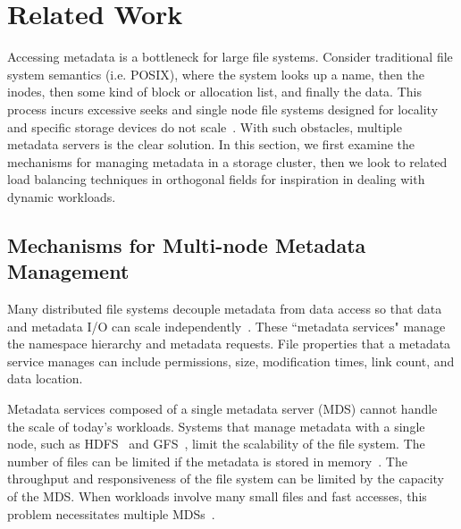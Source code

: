 
\chapter{Related Work}
\label{related-work}
Accessing metadata is a bottleneck for large file systems.  Consider traditional file system semantics (i.e. POSIX), where the system looks up a name, then the inodes, then some kind of block or allocation list, and finally the data. This process incurs excessive seeks and single node file systems designed for locality and specific storage devices do not scale~\cite{mckusick:acm1984-FFS, rosenblum:acm1992-LFS}. With such obstacles, multiple metadata servers is the clear solution. In this section, we first examine the mechanisms for managing metadata in a storage cluster, then we look to related load balancing techniques in orthogonal fields for inspiration in dealing with dynamic workloads.

\section{Mechanisms for Multi-node Metadata Management}
\label{related-work:mechanisms}
Many distributed file systems decouple metadata from data access so that data and metadata I/O can scale independently~\cite{alam:pdsw2011-metadata-scaling, ghemawat:sosp2003-gfs, hildebrand:msst2005-pnfs,website:lustre,weil:osdi2006-ceph,welch:fast2008-panasas,xing:sc2009-skyfs}. These ``metadata services" manage the namespace hierarchy and metadata requests. File properties that a metadata service manages can include permissions, size, modification times, link count, and data location. 

Metadata services composed of a single metadata server (MDS) cannot handle the scale of today's workloads. Systems that manage metadata with a single node, such as HDFS~\cite{shvachko:login2012-hdfs-scalability} and GFS~\cite{ghemawat:sosp2003-gfs},  limit the scalability of the file system. The number of files can be limited if the metadata is stored in memory~\cite{ghemawat:sosp2003-gfs, weil:osdi2006-ceph,shvachko:login2012-hdfs-scalability}. The throughput and responsiveness of the file system can be limited by the capacity of the MDS. When workloads involve many small files and fast accesses, this problem necessitates multiple MDSs~\cite{mckusick:acm2010-gfs-evolution}. 

